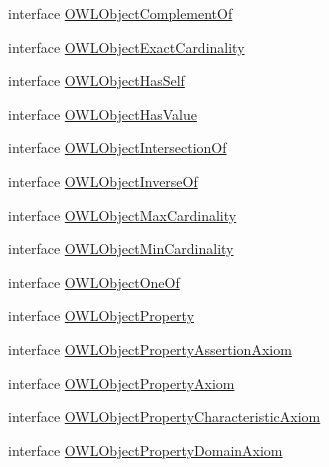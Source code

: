 \begin{DoxyCompactItemize}
\item 
interface \hyperlink{interfaceorg_1_1semanticweb_1_1owlapi_1_1model_1_1_o_w_l_object_complement_of}{O\-W\-L\-Object\-Complement\-Of}
\item 
interface \hyperlink{interfaceorg_1_1semanticweb_1_1owlapi_1_1model_1_1_o_w_l_object_exact_cardinality}{O\-W\-L\-Object\-Exact\-Cardinality}
\item 
interface \hyperlink{interfaceorg_1_1semanticweb_1_1owlapi_1_1model_1_1_o_w_l_object_has_self}{O\-W\-L\-Object\-Has\-Self}
\item 
interface \hyperlink{interfaceorg_1_1semanticweb_1_1owlapi_1_1model_1_1_o_w_l_object_has_value}{O\-W\-L\-Object\-Has\-Value}
\item 
interface \hyperlink{interfaceorg_1_1semanticweb_1_1owlapi_1_1model_1_1_o_w_l_object_intersection_of}{O\-W\-L\-Object\-Intersection\-Of}
\item 
interface \hyperlink{interfaceorg_1_1semanticweb_1_1owlapi_1_1model_1_1_o_w_l_object_inverse_of}{O\-W\-L\-Object\-Inverse\-Of}
\item 
interface \hyperlink{interfaceorg_1_1semanticweb_1_1owlapi_1_1model_1_1_o_w_l_object_max_cardinality}{O\-W\-L\-Object\-Max\-Cardinality}
\item 
interface \hyperlink{interfaceorg_1_1semanticweb_1_1owlapi_1_1model_1_1_o_w_l_object_min_cardinality}{O\-W\-L\-Object\-Min\-Cardinality}
\item 
interface \hyperlink{interfaceorg_1_1semanticweb_1_1owlapi_1_1model_1_1_o_w_l_object_one_of}{O\-W\-L\-Object\-One\-Of}
\item 
interface \hyperlink{interfaceorg_1_1semanticweb_1_1owlapi_1_1model_1_1_o_w_l_object_property}{O\-W\-L\-Object\-Property}
\item 
interface \hyperlink{interfaceorg_1_1semanticweb_1_1owlapi_1_1model_1_1_o_w_l_object_property_assertion_axiom}{O\-W\-L\-Object\-Property\-Assertion\-Axiom}
\item 
interface \hyperlink{interfaceorg_1_1semanticweb_1_1owlapi_1_1model_1_1_o_w_l_object_property_axiom}{O\-W\-L\-Object\-Property\-Axiom}
\item 
interface \hyperlink{interfaceorg_1_1semanticweb_1_1owlapi_1_1model_1_1_o_w_l_object_property_characteristic_axiom}{O\-W\-L\-Object\-Property\-Characteristic\-Axiom}
\item 
interface \hyperlink{interfaceorg_1_1semanticweb_1_1owlapi_1_1model_1_1_o_w_l_object_property_domain_axiom}{O\-W\-L\-Object\-Property\-Domain\-Axiom}
\item 

\end{DoxyCompactItemize}
